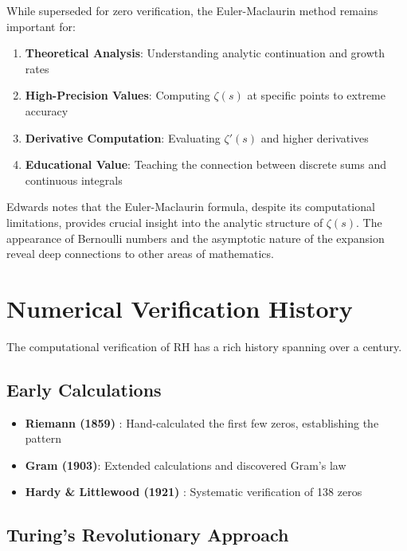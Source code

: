 While superseded for zero verification, the Euler-Maclaurin method remains important for:

\begin{enumerate}
\item \textbf{Theoretical Analysis}: Understanding analytic continuation and growth rates
\item \textbf{High-Precision Values}: Computing $\zeta(s)$ at specific points to extreme accuracy
\item \textbf{Derivative Computation}: Evaluating $\zeta'(s)$ and higher derivatives
\item \textbf{Educational Value}: Teaching the connection between discrete sums and continuous integrals
\end{enumerate}

\begin{remark}
Edwards notes that the Euler-Maclaurin formula, despite its computational limitations, provides crucial insight into the analytic structure of $\zeta(s)$. The appearance of Bernoulli numbers and the asymptotic nature of the expansion reveal deep connections to other areas of mathematics.
\end{remark}

\section{Numerical Verification History}
\label{sec:verification-history}

The computational verification of RH has a rich history spanning over a century.

\subsection{Early Calculations}

\begin{itemize}
\item \textbf{Riemann (1859)} \cite{riemann1859}: Hand-calculated the first few zeros, establishing the pattern
\item \textbf{Gram (1903)}: Extended calculations and discovered Gram's law
\item \textbf{Hardy \& Littlewood (1921)} \cite{hardy1914}: Systematic verification of 138 zeros
\end{itemize}

\subsection{Turing's Revolutionary Approach}

